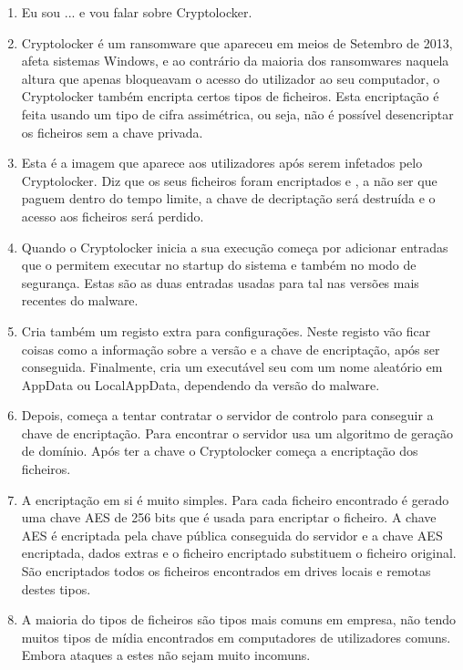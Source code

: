 \documentclass[a4paper,10pt]{report}
\begin{document}
\begin{enumerate}
	\item Eu sou ... e vou falar sobre Cryptolocker.
	\item Cryptolocker é um ransomware que apareceu em meios de Setembro de 2013, afeta sistemas Windows,
e ao contrário da maioria dos ransomwares naquela altura que apenas bloqueavam o acesso
do utilizador ao seu computador, o Cryptolocker também encripta certos tipos de ficheiros.
	Esta encriptação é feita usando um tipo de cifra assimétrica, ou seja, não é possível
desencriptar os ficheiros sem a chave privada.

	\item Esta é a imagem que aparece aos utilizadores após serem infetados pelo Cryptolocker.
	Diz que os seus ficheiros foram encriptados e , a não ser que paguem dentro do tempo limite,
a chave de decriptação será destruída e o acesso aos ficheiros será perdido.

	\item Quando o Cryptolocker inicia a sua execução começa por adicionar entradas que o permitem 
executar no startup do sistema e também no modo de segurança.
Estas são as duas entradas usadas para tal nas versões mais recentes do malware.

	\item Cria também um registo extra para configurações. Neste registo vão ficar coisas 
como a informação sobre a versão e a chave de encriptação, após ser conseguida.
	Finalmente, cria um executável seu com um nome aleatório em AppData ou LocalAppData, dependendo da versão
do malware.

	\item Depois, começa a tentar contratar o servidor de controlo para conseguir a chave de encriptação. 
Para encontrar o servidor usa um algoritmo de geração de domínio.
	Após ter a chave o Cryptolocker começa a encriptação dos ficheiros.

	\item A encriptação em si é muito simples. Para cada ficheiro encontrado é gerado uma chave AES de 256 bits 
que é usada para encriptar o ficheiro. A chave AES é encriptada pela chave pública conseguida do servidor
e a chave AES encriptada, dados extras e o ficheiro encriptado substituem o ficheiro original.
	São encriptados todos os ficheiros encontrados em drives locais e remotas destes tipos.

	\item A maioria do tipos de ficheiros são tipos mais comuns em empresa, não tendo muitos tipos de mídia
encontrados em computadores de utilizadores comuns. Embora ataques a estes não sejam muito incomuns.


\end{enumerate}
\end{document}
